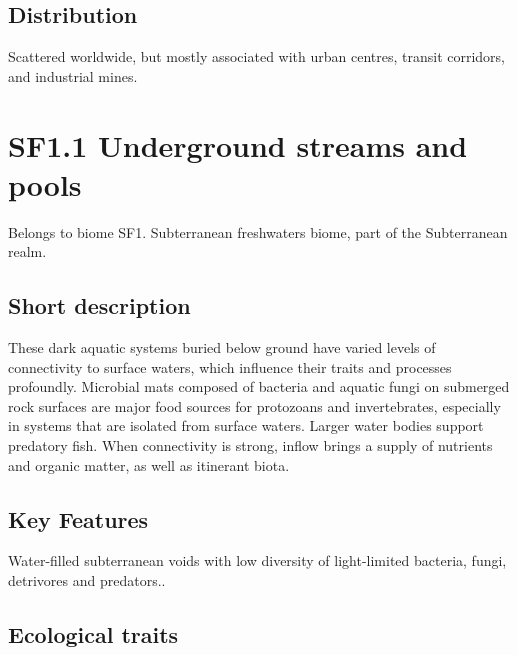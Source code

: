 \documentclass[
  letterpaper,
  DIV=11,
  numbers=noendperiod]{scrartcl}
\begin{document}
\subsection{Distribution}\label{distribution-61}

Scattered worldwide, but mostly associated with urban centres, transit
corridors, and industrial mines.

\section{SF1.1 Underground streams and
pools}\label{sf1.1-underground-streams-and-pools}

Belongs to biome SF1. Subterranean freshwaters biome, part of the
Subterranean realm.

\subsection{Short description}\label{short-description-62}

These dark aquatic systems buried below ground have varied levels of
connectivity to surface waters, which influence their traits and
processes profoundly. Microbial mats composed of bacteria and aquatic
fungi on submerged rock surfaces are major food sources for protozoans
and invertebrates, especially in systems that are isolated from surface
waters. Larger water bodies support predatory fish. When connectivity is
strong, inflow brings a supply of nutrients and organic matter, as well
as itinerant biota.

\subsection{Key Features}\label{key-features-62}

Water-filled subterranean voids with low diversity of light-limited
bacteria, fungi, detrivores and predators..

\subsection{Ecological traits}\label{ecological-traits-62}
\end{document}
